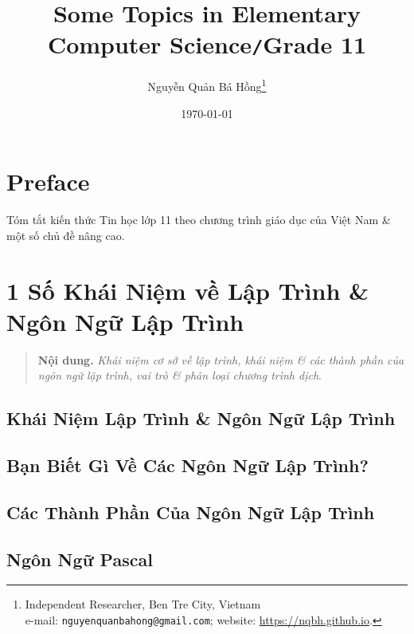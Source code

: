 \documentclass[oneside]{book}
\title{Some Topics in Elementary Computer Science\texttt{/}Grade 11}
\author{Nguyễn Quản Bá Hồng\footnote{Independent Researcher, Ben Tre City, Vietnam\\e-mail: \texttt{nguyenquanbahong@gmail.com}; website: \url{https://nqbh.github.io}.}}
\date{\today}
\numberwithin{equation}{section}
\begin{document}
\frontmatter
\maketitle
\setcounter{secnumdepth}{4}
\setcounter{tocdepth}{3}
\tableofcontents
\newpage


\mainmatter

\chapter*{Preface}

Tóm tắt kiến thức Tin học lớp 11 theo chương trình giáo dục của Việt Nam \& một số chủ đề nâng cao.


\chapter{1 Số Khái Niệm về Lập Trình \& Ngôn Ngữ Lập Trình}

\begin{quotation}
	\textbf{Nội dung.} \textit{Khái niệm cơ sở về lập trình, khái niệm \& các thành phần của ngôn ngữ lập trình, vai trò \& phân loại chương trình dịch}.
\end{quotation}

\section{Khái Niệm Lập Trình \& Ngôn Ngữ Lập Trình}

\section{Bạn Biết Gì Về Các Ngôn Ngữ Lập Trình?}

\section{Các Thành Phần Của Ngôn Ngữ Lập Trình}

\section{Ngôn Ngữ Pascal}

\end{document}
